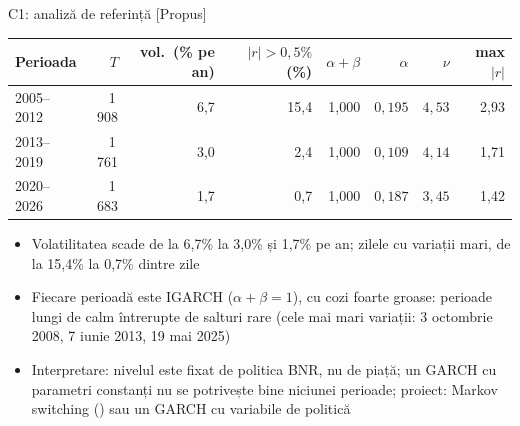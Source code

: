 \ifsolutions
\begin{frame}{C1: analiză de referință [Propus]}
\itemsize{\footnotesize}
\begin{center}
\scriptsize
\begin{tabular}{lrrrrrrr}
\toprule
Perioada & $T$ & vol.\ (\% pe an) & $|r| > 0{,}5\%$ (\%) & $\alpha + \beta$ & $\alpha$ & $\nu$ & max $|r|$ \\
\midrule
2005--2012 & 1\,908 & 6{,}7 & 15{,}4 & 1{,}000 & $0{,}195$ & $4{,}53$ & 2{,}93 \\
2013--2019 & 1\,761 & 3{,}0 & 2{,}4 & 1{,}000 & $0{,}109$ & $4{,}14$ & 1{,}71 \\
2020--2026 & 1\,683 & 1{,}7 & 0{,}7 & 1{,}000 & $0{,}187$ & $3{,}45$ & 1{,}42 \\
\bottomrule
\end{tabular}
\end{center}
\begin{itemize}
    \item Volatilitatea scade de la 6{,}7\% la 3{,}0\% și 1{,}7\% pe an; zilele cu variații mari, de la 15{,}4\% la 0{,}7\% dintre zile
    \item Fiecare perioadă este IGARCH ($\alpha + \beta = 1$), cu cozi foarte groase: perioade lungi de calm întrerupte de salturi rare (cele mai mari variații: 3 octombrie 2008, 7 iunie 2013, 19 mai 2025)
    \item Interpretare: nivelul este fixat de politica BNR, nu de piață; un GARCH cu parametri constanți nu se potrivește bine niciunei perioade; proiect: Markov switching () sau un GARCH cu variabile de politică
\end{itemize}
\end{frame}
\fi

